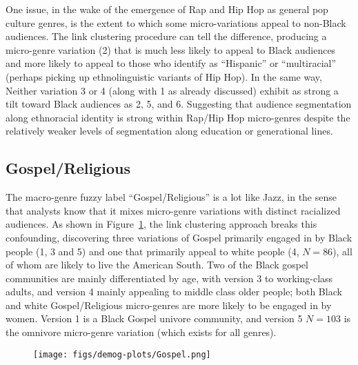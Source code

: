 One issue, in the wake of the emergence of Rap and Hip Hop as general pop culture genres, is the extent to which some micro-variations appeal to non-Black audiences. The link clustering procedure can tell the difference, producing a micro-genre variation (2) that is much less likely to appeal to Black audiences and more likely to appeal to those who identify as ``Hispanic'' or ``multiracial'' (perhaps picking up ethnolinguistic variants of Hip Hop). In the same way, Neither variation 3 or 4 (along with 1 as already discussed) exhibit as strong a tilt toward Black audiences as 2, 5, and 6. Suggesting that audience segmentation along ethnoracial identity is strong within Rap/Hip Hop micro-genres despite the relatively weaker levels of segmentation along education or generational lines. 

\subsection{Gospel/Religious}
The macro-genre fuzzy label ``Gospel/Religious'' is a lot like Jazz, in the sense that analysts know that it mixes micro-genre variations with distinct racialized audiences. As shown in Figure~\ref{fig:gospel}, the link clustering approach breaks this confounding, discovering three variations of Gospel primarily engaged in by Black people (1, 3 and 5) and one that primarily appeal to white people (4, $N = 86$), all of whom are likely to live the American South. Two of the Black gospel communities are mainly differentiated by age, with version 3 to working-class adults, and version 4 mainly appealing to middle class older people; both Black and white Gospel/Religious micro-genres are more likely to be engaged in by women. Version 1 is a Black Gospel univore community, and version 5 $N = 103$ is the omnivore micro-genre variation (which exists for all genres).      

 \begin{figure}[ht!]
 \centering
 \texttt{[image: figs/demog-plots/Gospel.png]}
 \caption{}
  \label{fig:gospel}
 \end{figure}

